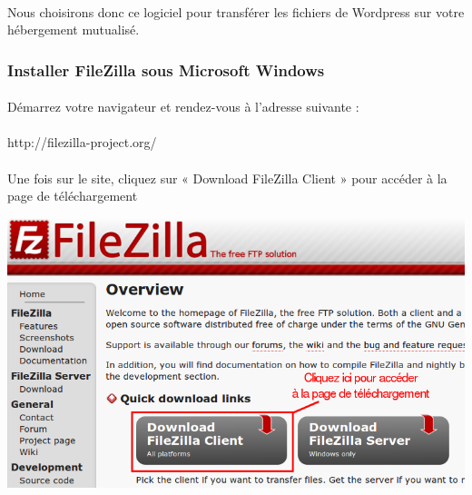 \documentclass[10pt,a4paper]{article}
\begin{document}
\paragraph{}Nous choisirons donc ce logiciel pour transférer les fichiers de 
Wordpress sur votre hébergement mutualisé.
\subsubsection{Installer FileZilla sous Microsoft Windows}
\paragraph{}Démarrez votre navigateur et rendez-vous à l'adresse suivante :
\paragraph{}http://filezilla-project.org/
\paragraph{}Une fois sur le site, cliquez sur « Download FileZilla Client » pour accéder à la page de téléchargement
\begin{center}
\includegraphics[scale=0.5]{img/0012.png}
\end{center}
\end{document}
